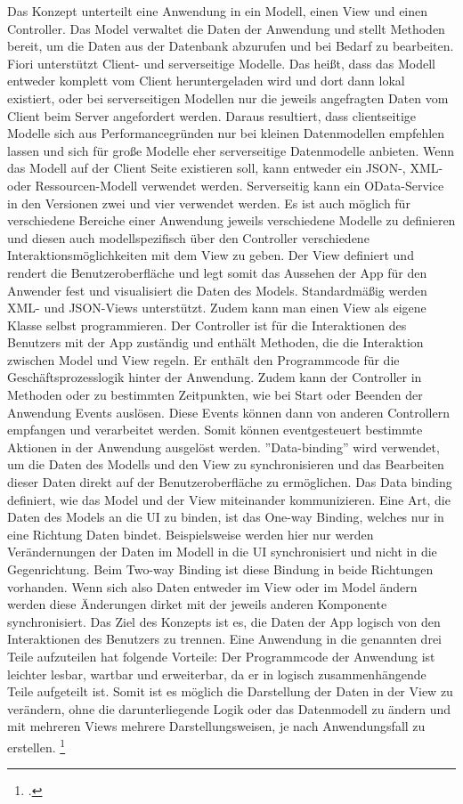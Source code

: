Das Konzept unterteilt eine Anwendung in ein Modell, einen View und einen Controller. Das Model verwaltet die Daten der Anwendung und stellt Methoden bereit, um die Daten aus der Datenbank abzurufen und bei Bedarf zu bearbeiten. Fiori unterstützt Client- und serverseitige Modelle. Das hei{\ss}t, dass das Modell entweder komplett vom Client heruntergeladen wird und dort dann lokal existiert, oder bei serverseitigen Modellen nur die jeweils angefragten Daten vom Client beim Server angefordert werden. Daraus resultiert, dass clientseitige Modelle sich aus Performancegründen nur bei kleinen Datenmodellen empfehlen lassen und sich für große Modelle eher serverseitige Datenmodelle anbieten. Wenn das Modell auf der Client Seite existieren soll, kann entweder ein JSON-, XML- oder Ressourcen-Modell verwendet werden. Serverseitig kann ein OData-Service in den Versionen zwei und vier verwendet werden. Es ist auch möglich für verschiedene Bereiche einer Anwendung jeweils verschiedene Modelle zu definieren und diesen auch modellspezifisch über den Controller verschiedene Interaktionsmöglichkeiten mit dem View zu geben. Der View definiert und rendert die Benutzeroberfläche und legt somit das Aussehen der App für den Anwender fest und visualisiert die Daten des Models. Standardmä{\ss}ig werden XML- und JSON-Views unterstützt. Zudem kann man einen View als eigene Klasse selbst programmieren. Der Controller ist für die Interaktionen des Benutzers mit der App zuständig und enthält Methoden, die die Interaktion zwischen Model und View regeln. Er enthält den Programmcode für die Geschäftsprozesslogik hinter der Anwendung. Zudem kann der Controller in Methoden oder zu bestimmten Zeitpunkten, wie \zB bei Start oder Beenden der Anwendung Events auslösen. Diese Events können dann von anderen Controllern empfangen und verarbeitet werden. Somit können eventgesteuert bestimmte Aktionen in der Anwendung ausgelöst werden. ''Data-binding'' wird verwendet, um die Daten des Modells und den View zu synchronisieren und das Bearbeiten dieser Daten direkt auf der Benutzeroberfläche zu ermöglichen. Das Data binding definiert, wie das Model und der View miteinander kommunizieren. Eine Art, die Daten des Models an die UI zu binden, ist das One-way Binding, welches nur in eine Richtung Daten bindet. Beispielsweise werden hier nur werden Verändernungen der Daten im Modell in die UI synchronisiert und nicht in die Gegenrichtung. Beim Two-way Binding ist diese Bindung in beide Richtungen vorhanden. Wenn sich also Daten entweder im View oder im Model ändern werden diese Änderungen dirket mit der jeweils anderen Komponente synchronisiert. Das Ziel des Konzepts ist es, die Daten der App logisch von den Interaktionen des Benutzers zu trennen. Eine Anwendung in die genannten drei Teile aufzuteilen hat folgende Vorteile: Der Programmcode der Anwendung ist leichter lesbar, wartbar und erweiterbar, da er in logisch zusammenhängende Teile aufgeteilt ist. Somit ist es möglich die Darstellung der Daten in der View zu verändern, ohne die darunterliegende Logik oder das Datenmodell zu ändern und mit mehreren Views mehrere Darstellungsweisen, je nach Anwendungsfall zu erstellen. \footcite[Vgl.][]{sap_sapui5-sap-hel-docu_2023}

